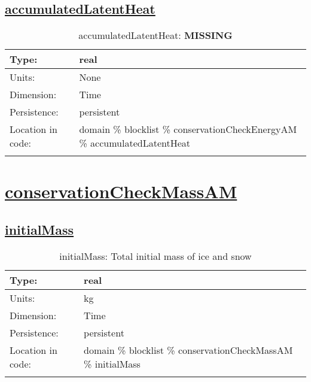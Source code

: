 \subsection[accumulatedLatentHeat]{\hyperref[sec:var_tab_conservationCheckEnergyAM]{accumulatedLatentHeat}}
\label{subsec:var_sec_conservationCheckEnergyAM_accumulatedLatentHeat}
\begin{center}
\begin{longtable}{| p{2.0in} | p{4.0in} |}
        \hline 
        Type: & real \\
        \hline 
        Units: & \si{None} \\
        \hline 
        Dimension: & Time \\
        \hline 
        Persistence: & persistent \\
        \hline 
         Location in code: & domain \% blocklist \% conservationCheckEnergyAM \% accumulatedLatentHeat \\
         \hline 
    \caption{accumulatedLatentHeat: {\bf \color{red} MISSING}}
\end{longtable}
\end{center}
\section[conservationCheckMassAM]{\hyperref[sec:var_tab_conservationCheckMassAM]{conservationCheckMassAM}}
\label{sec:var_sec_conservationCheckMassAM}
\subsection[initialMass]{\hyperref[sec:var_tab_conservationCheckMassAM]{initialMass}}
\label{subsec:var_sec_conservationCheckMassAM_initialMass}
\begin{center}
\begin{longtable}{| p{2.0in} | p{4.0in} |}
        \hline 
        Type: & real \\
        \hline 
        Units: & \si{kg} \\
        \hline 
        Dimension: & Time \\
        \hline 
        Persistence: & persistent \\
        \hline 
         Location in code: & domain \% blocklist \% conservationCheckMassAM \% initialMass \\
         \hline 
    \caption{initialMass: Total initial mass of ice and snow}
\end{longtable}
\end{center}
